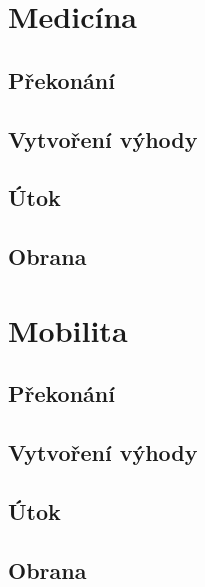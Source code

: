 \documentclass[../main.tex]{subfiles}
\begin{document}
\section{Medicína}
\label{sec:medicina}

\subsection*{Překonání}
\label{subsec:medicina-prekonani}
\prekonani

\subsection*{Vytvoření výhody}
\label{subsec:medicina-vytvoreni}
\vytvoreni

\subsection*{Útok}
\label{subsec:medicina-utok}
\utok

\subsection*{Obrana}
\label{subsec:medicina-obrana}
\obrana

\section{Mobilita}
\label{sec:mobilita}

\subsection*{Překonání}
\label{subsec:mobilita-prekonani}
\prekonani

\subsection*{Vytvoření výhody}
\label{subsec:mobilita-vytvoreni}
\vytvoreni

\subsection*{Útok}
\label{subsec:mobilita-utok}
\utok

\subsection*{Obrana}
\label{subsec:mobilita-obrana}
\obrana
\end{document}
